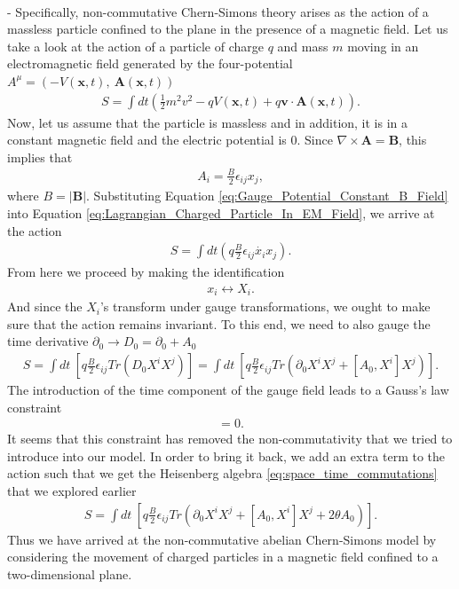     \\ 
    - Specifically, non-commutative Chern-Simons theory arises as the action of a massless particle confined to the plane in the presence of a magnetic field. \cite{Polychronakos:2001mi} Let us take a look at the action of a particle of charge $q$ and mass $m$ moving in an electromagnetic field generated by the four-potential $A^{\mu} = \left(-V(\bm{x}, t), \ \bm{A}(\bm{x},t)\right)$
    \begin{align}
        S = \int dt \left(\frac{1}{2} m^2 v^2 - q V(\bm{x},t) + q \bm{v} \cdot \bm{A}(\bm{x},t)\right). \label{eq:Lagrangian_Charged_Particle_In_EM_Field}
    \end{align}
    Now, let us assume that the particle is massless and in addition, it is in a constant magnetic field and the electric potential is 0. Since $\nabla \times \bm{A} = \bm{B}$, this implies that
    \begin{align}
        A_i = \frac{B}{2} \epsilon_{i j} x_j \label{eq:Gauge_Potential_Constant_B_Field},
    \end{align}
    where $B= |\bm{B}|$.
    Substituting Equation \eqref{eq:Gauge_Potential_Constant_B_Field}  into Equation \eqref{eq:Lagrangian_Charged_Particle_In_EM_Field}, we arrive at the action
    \begin{align}
        S = \int dt \left( q \frac{B}{2}\epsilon_{i j} \dot{x_i} x_j \right).
    \end{align}
    From here we proceed by making the identification
    \begin{align}
        x_i \leftrightarrow X_i.
    \end{align}
    And since the $X_i$'s transform under gauge transformations, we ought to make sure that the action remains invariant. To this end, we need to also gauge the time derivative $\partial_0 \rightarrow D_0 = \partial_0 +A_0$
    \begin{align}
        S = \int dt \ \left[ q \frac{B}{2} \epsilon_{ij} Tr \left(D_0 X^i X^j \right) \right] = \int dt \ \left[ q \frac{B}{2} \epsilon_{ij} Tr \left(\partial_0 X^i X^j + [A_0, X^i] X^j \right) \right].
    \end{align}
    The introduction of the time component of the gauge field leads to a Gauss's law constraint
    \begin{align}
        [X^1, X^2] =0.
    \end{align}
    It seems that this constraint has removed the non-commutativity that we tried to introduce into our model. In order to bring it back, we add an extra term to the action such that we get the Heisenberg algebra \eqref{eq:space_time_commutations} that we explored earlier
    \begin{align}
        S =\int dt \ \left[ q \frac{B}{2} \epsilon_{ij} Tr \left(\partial_0 X^i X^j + [A_0, X^i] X^j + 2 \theta A_0 \right) \right].
    \end{align}
    Thus we have arrived at the non-commutative abelian Chern-Simons model by considering the movement of charged particles in a magnetic field confined to a two-dimensional plane.

    

